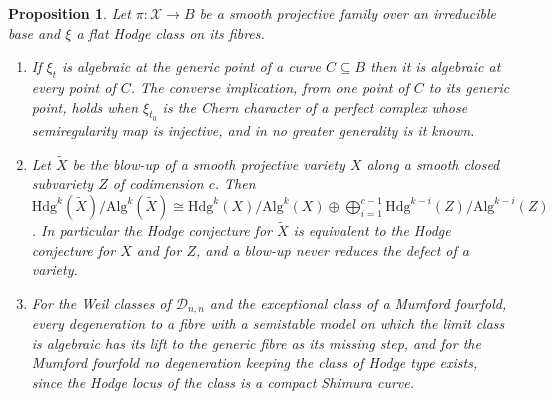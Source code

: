 \documentclass[11pt,reqno]{amsart}
\numberwithin{equation}{section}
\theoremstyle{plain}
\newtheorem{proposition}[theorem]{Proposition}
\theoremstyle{definition}
\newcommand{\Hdg}{\mathrm{Hdg}}
\newcommand{\Alg}{\mathrm{Alg}}
\newcommand{\cD}{\mathcal{D}}
\begin{document}
\begin{proposition}\label{prop:bypass}
Let $\pi:\mathcal{X}\to B$ be a smooth projective family over an irreducible base and $\xi$ a flat Hodge class on its fibres.
\begin{enumerate}[label=\textup{(\roman*)},leftmargin=2.4em,itemsep=2pt]
\item If $\xi_{t}$ is algebraic at the generic point of a curve $C\subseteq B$ then it is algebraic at every point of $C$. The converse implication, from one point of $C$ to its generic point, holds when $\xi_{t_{0}}$ is the Chern character of a perfect complex whose semiregularity map is injective, and in no greater generality is it known.
\item Let $\tilde X$ be the blow-up of a smooth projective variety $X$ along a smooth closed subvariety $Z$ of codimension $c$. Then $\Hdg^{k}(\tilde X)/\Alg^{k}(\tilde X)\cong\Hdg^{k}(X)/\Alg^{k}(X)\oplus\bigoplus_{i=1}^{c-1}\Hdg^{k-i}(Z)/\Alg^{k-i}(Z)$. In particular the Hodge conjecture for $\tilde X$ is equivalent to the Hodge conjecture for $X$ and for $Z$, and a blow-up never reduces the defect of a variety.
\item For the Weil classes of $\cD_{n,n}$ and the exceptional class of a Mumford fourfold, every degeneration to a fibre with a semistable model on which the limit class is algebraic has its lift to the generic fibre as its missing step, and for the Mumford fourfold no degeneration keeping the class of Hodge type exists, since the Hodge locus of the class is a compact Shimura curve.
\end{enumerate}
\end{proposition}
\end{document}
